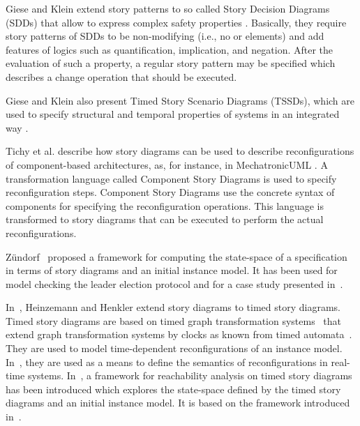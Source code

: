 Giese and Klein extend story patterns to so called Story Decision Diagrams (SDDs) that allow to express complex safety properties \cite{GK06a}.
Basically, they require story patterns of SDDs to be non-modifying (i.e., no \create or \destroy elements) and add features of logics such as quantification, implication, and negation.
After the evaluation of such a property, a regular story pattern may be specified which describes a change operation that should be executed.

Giese and Klein also present Timed Story Scenario Diagrams (TSSDs), which are used to specify structural and temporal properties of systems in an integrated way \cite{KG07a}.

Tichy et al. \cite{THH+08} describe how story diagrams can be used to describe reconfigurations of component-based architectures, as, for instance, in MechatronicUML \cite{BBD+12}.
A transformation language called Component Story Diagrams is used to specify reconfiguration steps.
Component Story Diagrams use the concrete syntax of components for specifying the reconfiguration operations.
This language is transformed to story diagrams that can be executed to perform the actual reconfigurations.

Z{\"u}ndorf~\cite{Zue09} proposed a framework for computing the state-space of a specification in terms of story diagrams and an initial instance model. 
It has been used for model checking the leader election protocol and for a case study presented in~\cite{HSJZ10}.

In~\cite{HH11b}, Heinzemann and Henkler extend story diagrams to timed story diagrams. 
Timed story diagrams are based on timed graph transformation systems~\cite{EHH+11} that extend graph transformation systems by clocks as known from timed automata~\cite{AD94}. 
They are used to model time-dependent reconfigurations of an instance model. 
In~\cite{EHH+11}, they are used as a means to define the semantics of reconfigurations in real-time systems. 
In~\cite{HSE10}, a framework for reachability analysis on timed story diagrams has been introduced which explores the state-space defined by the timed story diagrams and an initial instance model. 
It is based on the framework introduced in~\cite{Zue09}.


